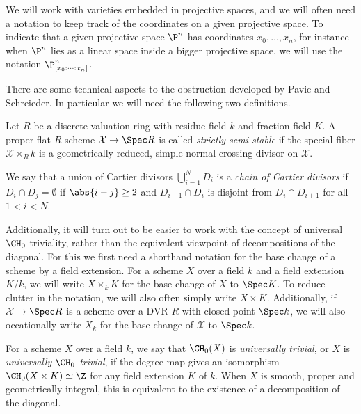 We will work with varieties embedded in projective spaces, and we will often need a notation to keep track of the coordinates on a given projective space. To indicate that a given projective space $\P^n$ has coordinates $x_0,\dots,x_n$, for instance when $\P^n$ lies as a linear space inside a bigger projective space, we will use the notation $\P^n_{[x_0:\dots:x_n]}$.

There are some technical aspects to the obstruction developed by Pavic and Schreieder. In particular we will need the following two definitions.
\begin{definition}
	Let $R$ be a discrete valuation ring with residue field $k$ and fraction field $K$. A proper flat $R$-scheme $\mathcal{X} \to \Spec R$ is called \emph{strictly semi-stable} if the special fiber $\mathcal{X} \times_R k$ is a geometrically reduced, simple normal crossing divisor on $\mathcal{X}$.
\end{definition}

\begin{definition}
	We say that a union of Cartier divisors $\bigcup_{i=1}^N D_i$ is a \emph{chain of Cartier divisors} if $D_i \cap D_j = \emptyset$ if $\abs{i-j} \geq 2$ and $D_{i-1} \cap D_i$ is disjoint from $D_i \cap D_{i+1}$ for all $1 < i < N$.
\end{definition}

Additionally, it will turn out to be easier to work with the concept of universal $\CH_0$-triviality, rather than the equivalent viewpoint of decompositions of the diagonal. For this we first need a shorthand notation for the base change of a scheme by a field extension. For a scheme $X$ over a field $k$ and a field extension $K/k$, we will write $X \times_k K$ for the base change of $X$ to $\Spec K$. To reduce clutter in the notation, we will also often simply write $X \times K$. Additionally, if $\mathcal{X} \to \Spec R$ is a scheme over a DVR $R$ with closed point $\Spec k$, we will also occationally write $X_k$ for the base change of $\mathcal{X}$ to $\Spec k$.

\begin{definition}
	For a scheme $X$ over a field $k$, we say that $\CH_0(X)$ is \emph{universally trivial}, or $X$ is \emph{universally $\CH_0$-trivial}, if the degree map gives an isomorphism $\CH_0(X \times K) \simeq \Z$ for any field extension $K$ of $k$. When $X$ is smooth, proper and geometrically integral, this is equivalent to the existence of a decomposition of the diagonal.
\end{definition}
%



